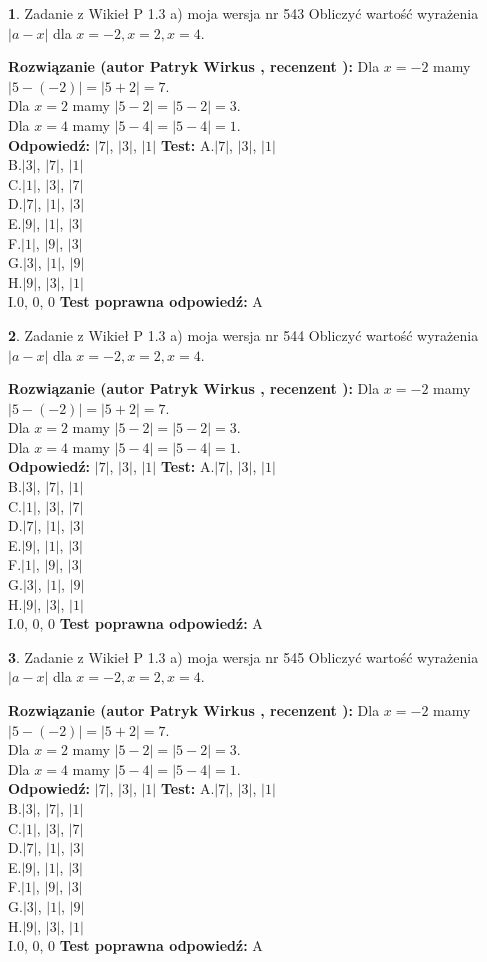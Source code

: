 \documentclass[12pt, a4paper]{article}
\theoremstyle{definition} %
\newtheorem{zad}{}
\newcommand{\zadStart}[1]{\begin{zad}#1\newline}
\newcommand{\zadStop}{\end{zad}}
\newcommand{\rozwStart}[2]{\noindent \textbf{Rozwiązanie (autor #1 , recenzent #2): }\newline}
\newcommand{\rozwStop}{\newline}
\newcommand{\odpStart}{\noindent \textbf{Odpowiedź:}\newline}
\newcommand{\odpStop}{\newline}
\newcommand{\testStart}{\noindent \textbf{Test:}\newline}
\newcommand{\testStop}{\newline}
\newcommand{\kluczStart}{\noindent \textbf{Test poprawna odpowiedź:}\newline}
\newcommand{\kluczStop}{\newline}
\begin{document}
\zadStart{Zadanie z Wikieł P 1.3 a) moja wersja nr 543}
Obliczyć wartość wyrażenia $|a - x|$ dla $x=-2,x=2,x=4$.
\zadStop
\rozwStart{Patryk Wirkus}{}
Dla $x = -2$ mamy $|5 - (-2)| = |5 + 2| = 7$.\\
Dla $x = 2$ mamy $|5 - 2| = |5 - 2| = 3$.\\
Dla $x = 4$ mamy $|5 - 4| = |5 - 4| = 1$.\\
\rozwStop
\odpStart
$|7|$, $|3|$, $|1|$
\odpStop
\testStart
A.$|7|$, $|3|$, $|1|$\\
B.$|3|$, $|7|$, $|1|$\\
C.$|1|$, $|3|$, $|7|$\\
D.$|7|$, $|1|$, $|3|$\\
E.$|9|$, $|1|$, $|3|$\\
F.$|1|$, $|9|$, $|3|$\\
G.$|3|$, $|1|$, $|9|$\\
H.$|9|$, $|3|$, $|1|$\\
I.$0$, $0$, $0$
\testStop
\kluczStart
A
\kluczStop



\zadStart{Zadanie z Wikieł P 1.3 a) moja wersja nr 544}
Obliczyć wartość wyrażenia $|a - x|$ dla $x=-2,x=2,x=4$.
\zadStop
\rozwStart{Patryk Wirkus}{}
Dla $x = -2$ mamy $|5 - (-2)| = |5 + 2| = 7$.\\
Dla $x = 2$ mamy $|5 - 2| = |5 - 2| = 3$.\\
Dla $x = 4$ mamy $|5 - 4| = |5 - 4| = 1$.\\
\rozwStop
\odpStart
$|7|$, $|3|$, $|1|$
\odpStop
\testStart
A.$|7|$, $|3|$, $|1|$\\
B.$|3|$, $|7|$, $|1|$\\
C.$|1|$, $|3|$, $|7|$\\
D.$|7|$, $|1|$, $|3|$\\
E.$|9|$, $|1|$, $|3|$\\
F.$|1|$, $|9|$, $|3|$\\
G.$|3|$, $|1|$, $|9|$\\
H.$|9|$, $|3|$, $|1|$\\
I.$0$, $0$, $0$
\testStop
\kluczStart
A
\kluczStop



\zadStart{Zadanie z Wikieł P 1.3 a) moja wersja nr 545}
Obliczyć wartość wyrażenia $|a - x|$ dla $x=-2,x=2,x=4$.
\zadStop
\rozwStart{Patryk Wirkus}{}
Dla $x = -2$ mamy $|5 - (-2)| = |5 + 2| = 7$.\\
Dla $x = 2$ mamy $|5 - 2| = |5 - 2| = 3$.\\
Dla $x = 4$ mamy $|5 - 4| = |5 - 4| = 1$.\\
\rozwStop
\odpStart
$|7|$, $|3|$, $|1|$
\odpStop
\testStart
A.$|7|$, $|3|$, $|1|$\\
B.$|3|$, $|7|$, $|1|$\\
C.$|1|$, $|3|$, $|7|$\\
D.$|7|$, $|1|$, $|3|$\\
E.$|9|$, $|1|$, $|3|$\\
F.$|1|$, $|9|$, $|3|$\\
G.$|3|$, $|1|$, $|9|$\\
H.$|9|$, $|3|$, $|1|$\\
I.$0$, $0$, $0$
\testStop
\kluczStart
A
\kluczStop
\end{document}

